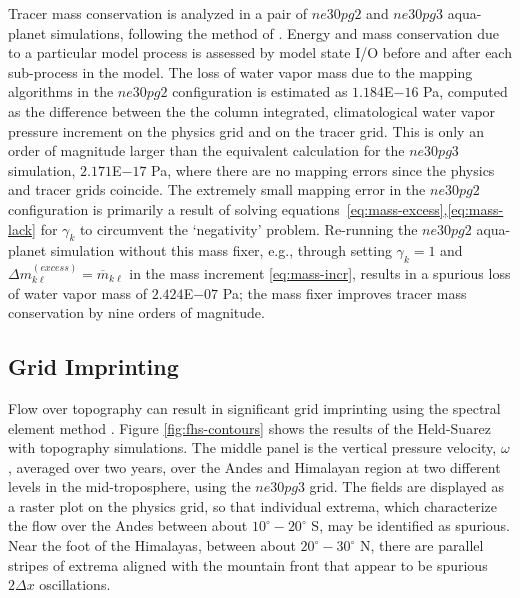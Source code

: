 \documentclass{agujournal}
\begin{document}
Tracer mass conservation is analyzed in a pair of $ne30pg2$ and $ne30pg3$ aqua-planet simulations, following the method of \cite{LW2019JAMES}. Energy and mass conservation due to a particular model process is assessed by model state I/O before and after each sub-process in the model. The loss of water vapor mass due to the mapping algorithms in the $ne30pg2$ configuration is estimated as $1.184$E$-16$ Pa, computed as the difference between the the column integrated, climatological water vapor pressure increment on the physics grid and on the tracer grid. This is only an order of magnitude larger than the equivalent calculation for the $ne30pg3$ simulation, $2.171$E$-17$ Pa, where there are no mapping errors since the physics and tracer grids coincide. The extremely small mapping error in the $ne30pg2$ configuration is primarily a result of solving equations~\eqref{eq:mass-excess},\eqref{eq:mass-lack} for $\gamma_k$ to circumvent the `negativity' problem. Re-running the $ne30pg2$ aqua-planet simulation without this mass fixer, e.g., through setting $\gamma_k=1$ and $\Delta m^{(excess)}_{k\ell} = \overline{m}_{k\ell}$ in the mass increment \eqref{eq:mass-incr}, results in a spurious loss of water vapor mass of $2.424$E$-07$ Pa; the mass fixer improves tracer mass conservation by nine orders of magnitude. 


\subsection{Grid Imprinting}\label{sec:hs94}

Flow over topography can result in significant grid imprinting using the spectral element method \citep[][H18]{gmdd-8-4623-2015}. Figure \ref{fig:fhs-contours} shows the results of the Held-Suarez with topography simulations. The middle panel is the vertical pressure velocity, $\omega$, averaged over two years, over the Andes and Himalayan region at two different levels in the mid-troposphere, using the $ne30pg3$ grid. The fields are displayed as a raster plot on the physics grid, so that individual extrema, which characterize the flow over the Andes between about $10^\circ-20^\circ$ S, may be identified as spurious. Near the foot of the Himalayas, between about $20^\circ-30^\circ$ N, there are parallel stripes of extrema aligned with the mountain front that appear to be spurious $2\Delta x$ oscillations.
\end{document}
